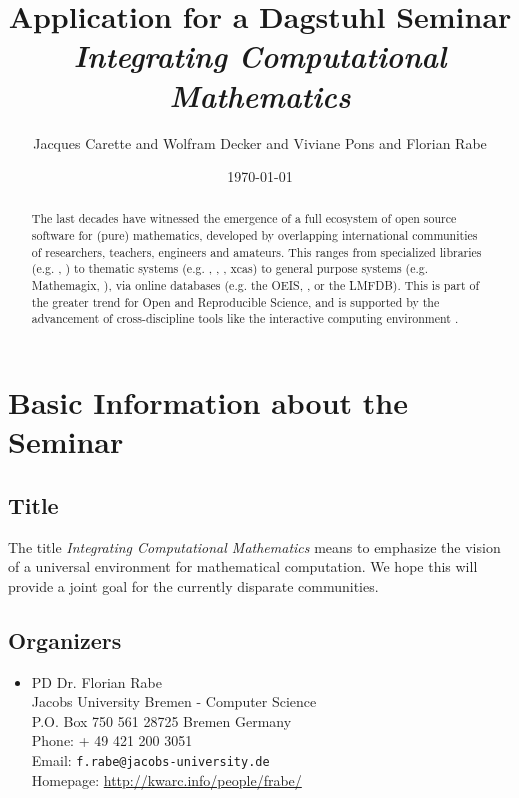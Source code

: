 \documentclass[a4paper,11pt]{article}
\title{Application for a Dagstuhl Seminar \\ \emph{Integrating Computational Mathematics}}
\author{Jacques Carette and Wolfram Decker and Viviane Pons and Florian Rabe}
\date{\today}
\begin{document}
\maketitle

\begin{abstract}
The last decades have witnessed the emergence of a full ecosystem of
open source software for (pure) mathematics, developed by overlapping
international communities of researchers, teachers, engineers and
amateurs. This ranges from specialized libraries (e.g. \MPIR, \Linbox)
to thematic systems (e.g. \GAP, \Pari, \Singular, xcas) to general
purpose systems (e.g. Mathemagix, \Sage), via online databases
(e.g. the OEIS, \MathHub, or the LMFDB). This is part of the greater
trend for Open and Reproducible Science, and is supported by the
advancement of cross-discipline tools like the interactive computing
environment \Jupyter.
\end{abstract}


\tableofcontents

\newpage

\section{Basic Information about the Seminar}

\subsection{Title}

The title \emph{Integrating Computational Mathematics} means to emphasize the vision of a universal environment for mathematical computation.
We hope this will provide a joint goal for the currently disparate communities.

\subsection{Organizers}

\begin{itemize}
\item PD Dr. Florian Rabe \\
Jacobs University Bremen - Computer Science\\
P.O. Box 750 561
28725 Bremen Germany
\\
Phone: + 49 421 200 3051\\
Email: \texttt{f.rabe@jacobs-university.de}  \\
Homepage: \url{http://kwarc.info/people/frabe/}
\end{itemize}
\end{document}
